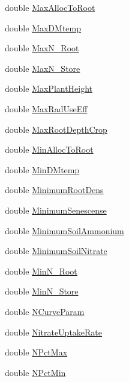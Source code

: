 \begin{DoxyCompactItemize}
\item 
double \hyperlink{classcrop_parameters_crop_ab4ad5e65e117f7f51a282a8bb81ec5d5}{MaxAllocToRoot}
\item 
double \hyperlink{classcrop_parameters_crop_abe31a84e812c3b42c9cce5f0671c82c4}{MaxDMtemp}
\item 
double \hyperlink{classcrop_parameters_crop_a4defb6b2c990aa913d519b06be16fb6f}{MaxN\_\-Root}
\item 
double \hyperlink{classcrop_parameters_crop_ac582cb5a383dc857aafbaaa7ad26d565}{MaxN\_\-Store}
\item 
double \hyperlink{classcrop_parameters_crop_a67cfa7354479004bbe3db704e14217b9}{MaxPlantHeight}
\item 
double \hyperlink{classcrop_parameters_crop_a251e4b986021e65413f79557220578cc}{MaxRadUseEff}
\item 
double \hyperlink{classcrop_parameters_crop_a969189541bfd67a2cbcb369e9a5882f0}{MaxRootDepthCrop}
\item 
double \hyperlink{classcrop_parameters_crop_a06c787517064d335857242233bd4d0f4}{MinAllocToRoot}
\item 
double \hyperlink{classcrop_parameters_crop_a31eb15a6853c48c3ebc62867fb626f27}{MinDMtemp}
\item 
double \hyperlink{classcrop_parameters_crop_a7dec90db638c70d8905fee259f96083d}{MinimumRootDens}
\item 
double \hyperlink{classcrop_parameters_crop_a767c97e074ed64082f3e8868b94892fb}{MinimumSenescense}
\item 
double \hyperlink{classcrop_parameters_crop_a352dca2661318167776d139b1c3bec70}{MinimumSoilAmmonium}
\item 
double \hyperlink{classcrop_parameters_crop_a98614de4b1c8fcfbd59fb75676adbbde}{MinimumSoilNitrate}
\item 
double \hyperlink{classcrop_parameters_crop_ab1e325e873ae49e7c6ca29e381c8c0de}{MinN\_\-Root}
\item 
double \hyperlink{classcrop_parameters_crop_a190955f285e04281de2c2891164c03fe}{MinN\_\-Store}
\item 
double \hyperlink{classcrop_parameters_crop_ada36adce6169a622ebd6d0e1dac7dd42}{NCurveParam}
\item 
double \hyperlink{classcrop_parameters_crop_a951975b9d39886c444f59bad508bc76d}{NitrateUptakeRate}
\item 
double \hyperlink{classcrop_parameters_crop_ad889e1512475e0fc10d79c499fd8dff9}{NPctMax}
\item 
double \hyperlink{classcrop_parameters_crop_aa82a46c75d7a1975a3179a2439d9ae4a}{NPctMin}

\end{DoxyCompactItemize}
